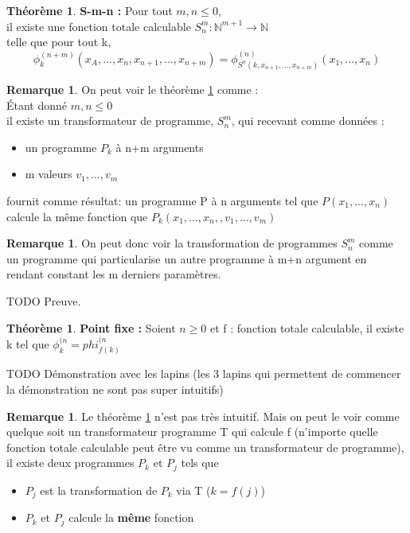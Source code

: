 \documentclass[11pt,a4paper]{article}
\newcommand{\N}{\mathbb{N}}
\theoremstyle{definition}
\newtheorem{myrem}[mydef]{Remarque}
\newtheorem{mytheo}[mydef]{Théorème}
\begin{document}
\begin{mytheo}
	\label{S-m-n}
	\textbf{S-m-n :} Pour tout $m,n \leq 0$, \\
	il existe une fonction totale calculable $S^m_n : \N^{m+1} \rightarrow 
	\N$ \\
	telle que pour tout k,
	$$ \phi^{(n+m)}_k(x_A,...,x_n,x_{n+1},...,x_{n+m}) = 
	\phi^{(n)}_{S^n(k,x_{n+1}, ...,x_{n+m})} (x_1,...,x_n)$$
\end{mytheo}

\begin{myrem}
	On peut voir le théorème \ref{S-m-n} comme : \\
	Étant donné $m,n \leq 0$\\
	il existe un transformateur de programme, $S^m_n$, qui recevant comme 
	données : 
	\begin{itemize}
		\item un programme $P_k$ à n+m arguments
		\item m valeurs $v_1,...,v_m$
	\end{itemize}
	fournit comme résultat: un programme P à n arguments tel que 
	$P(x_1,...,x_n)$ calcule la même fonction que 
	$P_k(x_1,...,x_n,,v_1,...,v_m)$
\end{myrem}

\begin{myrem}
	On peut donc voir la transformation de programmes $S^m_n$ comme un 
	programme qui particularise un autre programme à m+n argument en rendant 
	constant les m derniers paramètres.
\end{myrem}
TODO Preuve.

\begin{mytheo}
	\label{point-fixe}
	\textbf{Point fixe :} Soient $n \geq 0$ et f : fonction totale 
	calculable, il existe k tel que $\phi^{(n}_k = phi^{(n}_{f(k)}$  
\end{mytheo}

TODO Démonstration avec les lapins (les 3 lapins qui permettent
de commencer la démonstration ne sont pas super intuitifs)
\begin{myrem}
	Le théorème \ref{point-fixe} n'est pas très intuitif. Mais on peut le 
	voir comme quelque soit un transformateur programme T qui calcule f 
	(n'importe quelle fonction totale calculable peut être vu comme un transformateur 
	de programme), \\
	il existe deux programmes $P_k$ et $P_j$ tels que 
	\begin{itemize}
		\item $P_j$ est la transformation de $P_k$ via T ($k=f(j)$)
		\item $P_k$ et $P_j$ calcule la \textbf{même} fonction
	\end{itemize}
\end{myrem}
\end{document}
